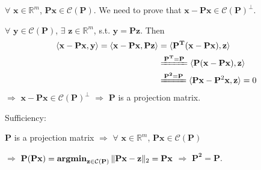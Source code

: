 \documentclass[11pt,letter,notitlepage]{article}
\DeclareMathOperator*{\argmin}{\bf argmin}
\theoremstyle{definition}
\begin{document}
\begin{solution}
\begin{enumerate}
\begin{enumerate}
		$\forall$ $\mathbf{x} \in \mathbb{R}^m$, $\mathbf{Px} \in \mathcal{C}(\mathbf{P})$. We need to prove that $\mathbf{x} - \mathbf{Px} \in \mathcal{C}(\mathbf{P})^{\perp}$.

		$\forall$ $\mathbf{y} \in \mathcal{C}(\mathbf{P})$, $\exists$ $\mathbf{z} \in \mathbb{R}^m$, s.t. $\mathbf{y} = \mathbf{Pz}$. Then
		\begin{align*}
		\langle \mathbf{x} - \mathbf{Px}, \mathbf{y} \rangle
		=
		\langle \mathbf{x} - \mathbf{Px}, \mathbf{Pz} \rangle
		&=
		\langle \mathbf{P^T}(\mathbf{x} - \mathbf{Px}), \mathbf{z} \rangle\\
		&\xlongequal{\mathbf{P^T} = \mathbf{P}}
		\langle \mathbf{P}(\mathbf{x} - \mathbf{Px}), \mathbf{z} \rangle\\
		&\xlongequal{\mathbf{P^2} = \mathbf{P}}
		\langle \mathbf{Px} - \mathbf{P}^2\mathbf{x}, \mathbf{z} \rangle
		=
		0
		\end{align*}
		$\Longrightarrow$ $\mathbf{x} - \mathbf{Px} \in \mathcal{C}(\mathbf{P})^{\perp}$ $\Longrightarrow$ $\mathbf{P}$ is a projection matrix.

		 Sufficiency:

		$\mathbf{P}$ is a projection matrix $\Longrightarrow$ $\forall$ $\mathbf{x} \in \mathbb{R}^m$, $\mathbf{Px} \in \mathcal{C}(\mathbf{P})$
		
		$\Longrightarrow$ $\mathbf{P}(\mathbf{Px}) = \argmin_{\mathbf{z} \in \mathcal{C}(\mathbf{P})} \Vert \mathbf{Px} - \mathbf{z} \Vert_2 = \mathbf{Px}$ $\Longrightarrow$ $\mathbf{P^2} = \mathbf{P}$.


\end{enumerate}
\end{enumerate}
\end{solution}
\end{document}
